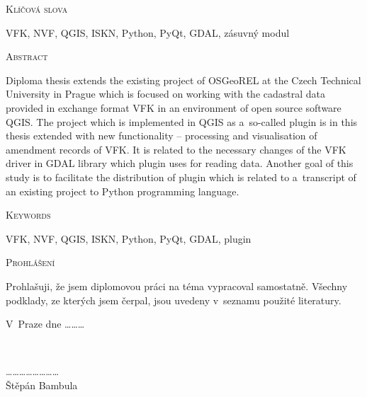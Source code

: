 \documentclass[a4paper,12pt,oneside]{book}
\begin{document}
\vspace{32pt}

\noindent
\textsc{\Large Klíčová slova}

\vspace{12pt}

VFK, NVF, QGIS, ISKN, Python, PyQt, GDAL, zásuvný modul


\vfill

\noindent
\textsc{\Large Abstract}

\vspace{12pt}

Diploma thesis extends the existing project of OSGeoREL at the Czech
Technical University in Prague which is focused on working with the
cadastral data provided in exchange format VFK in an environment of
open source software QGIS. The project which is implemented in QGIS as
a~so-called plugin is in this thesis extended with new functionality
-- processing and visualisation of amendment records of VFK. It is
related to the necessary changes of the VFK driver in GDAL library
which plugin uses for reading data. Another goal of this study is to
facilitate the distribution of plugin which is related to a~transcript
of an existing project to Python programming language.

\vspace{32pt}

\noindent
\textsc{\Large Keywords}

\vspace{12pt}
VFK, NVF, QGIS, ISKN, Python, PyQt, GDAL, plugin


\vfill

\clearpage
\vspace*{\fill}

\noindent
\textsc{\Large Prohlášení}

\vspace{12pt} Prohlašuji, že jsem diplomovou práci na téma
vypracoval samostatně. Všechny podklady, ze kterých jsem čerpal, jsou
uvedeny v~seznamu použité literatury.

\vspace{24pt}
\noindent
\begin{minipage}{0.4\textwidth}
\begin{flushleft}
\center 
V~Praze dne \dots \dots \dots \\
\end{flushleft}
\end{minipage}
~
\begin{minipage}{0.8\textwidth}
\begin{flushright} 
\vspace{20pt}
\center
\dots \dots \dots \dots \dots \dots \dots \dots \\
Štěpán Bambula
\end{flushright}
\end{minipage}\\[2cm]
\end{document}
